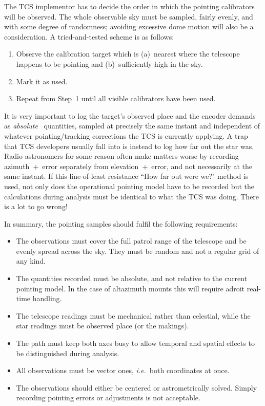 \documentclass[11pt,fleqn,twoside,\paper]{article}
\renewcommand{\_}{{\tt\char'137}}     %
\begin{document}
The TCS implementor has to decide the order in which
the pointing calibrators will be observed.  The whole observable
sky must be sampled, fairly evenly, and with some degree
of randomness; avoiding excessive dome motion will also be a
consideration.  A tried-and-tested scheme is as follows:
\begin{enumerate}
\item Observe the calibration target which is
      (a)~nearest where the telescope happens to be pointing and
      (b)~sufficiently high in the sky.
\item Mark it as used.
\item Repeat from Step~1 until all visible calibrators
      have been used.
\end{enumerate}
It is very important to log the target's observed place and
the encoder demands as {\it absolute}~ quantities, sampled at
precisely the same instant and independent of whatever
pointing/tracking corrections the TCS is currently
applying.  A trap that TCS developers
usually fall into is instead to log how far out the star was.
Radio astronomers for some reason often make matters worse by
recording azimuth~+~error separately from
elevation~+~error,
and not necessarily at the same
instant.  If this line-of-least resistance ``How far out were we?"
method is used, not only does the operational pointing model have
to be recorded but the calculations during analysis must
be identical to what the TCS was doing.  There is a lot to go
wrong!

In summary, the pointing samples should fulfil the following
requirements:
\begin{itemize}
\item The observations must cover the full patrol range of the telescope
and be evenly spread across the sky.  They must be random and not
a regular grid of any kind.
\item The quantities recorded
must be absolute, and not relative to the current pointing
model.  In the case of altazimuth mounts this will require adroit
real-time handling.
\item The telescope readings must be mechanical rather than celestial,
while the star readings must be observed place (or the makings).
\item The path must keep both axes busy to allow
temporal and spatial effects to be distinguished during analysis.
\item All observations must be vector ones, {\it i.e.}~both coordinates at
once.
\item The observations should either be centered or astrometrically
solved.  Simply recording pointing errors or adjustments is not
acceptable.
\end{itemize}
\end{document}
